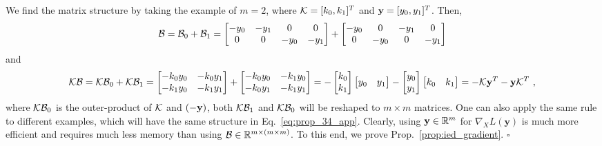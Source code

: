 We find the matrix structure by taking the example of $m=2$, where $\mathcal{K}=[ k_0, k_1 ]^T$ and $\mathbf{y} = [ y_0, y_1 ]^T$.
Then,
%
\begin{equation}
\mathcal{B}
= \mathcal{B}_0 + \mathcal{B}_1
= \begin{bmatrix}
-y_0 & -y_1 & 0 & 0 \\
0 & 0 & -y_0 & -y_1
\end{bmatrix}
+
\begin{bmatrix}
-y_0 & 0 & -y_1 & 0 \\
0 & -y_0 & 0 & -y_1
\end{bmatrix}
\end{equation}
%
and
%
\begin{equation}
\mc{K} \mc{B}
= \mc{K} \mc{B}_0 + \mc{K} \mc{B}_1 =
\begin{bmatrix}
-k_0 y_0 & -k_0 y_1 \\
-k_1 y_0 & -k_1 y_1
\end{bmatrix}
+
\begin{bmatrix}
-k_0 y_0 & -k_1 y_0 \\
-k_0 y_1 & -k_1 y_1
\end{bmatrix}
=
-\begin{bmatrix}
k_0\\
k_1
\end{bmatrix}
%
\begin{bmatrix}
y_0 & y_1
\end{bmatrix}
-
\begin{bmatrix}
y_0\\
y_1
\end{bmatrix}
%
\begin{bmatrix}
k_0 & k_1
\end{bmatrix}
=
- \mc{K} \mb{y}^T - \mb{y} \mc{K}^T\ ,
\end{equation}
%
where $\mathcal{K} \mathcal{B}_0$ is the outer-product of $\mathcal{K}$ and $(-\mathbf{y})$, both $\mathcal{K} \mathcal{B}_1$ and $\mathcal{K} \mathcal{B}_0$ will be reshaped to $m \times m$ matrices.
One can also apply the same rule to different examples, which will have the same
structure in Eq.~\eqref{eq:prop_34_app}.
Clearly, using $\mathbf{y} \in \mathbb{R}^{m}$ for $\nabla_X L(\mathbf{y})$ is much more efficient and requires much less memory than using $\mathcal{B} \in \mathbb{R}^{m \times (m \times m)}$.
%
To this end, we prove Prop.~\ref{prop:ied_gradient}. $\square$

